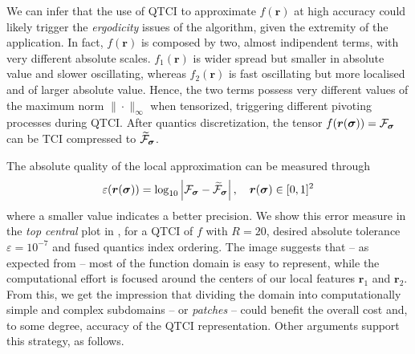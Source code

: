 We can infer that the use of QTCI to approximate $f(\boldsymbol{r})$ at high accuracy could likely trigger the \textit{ergodicity} issues of the algorithm, given the extremity of the application. In fact, $f(\boldsymbol{r})$ is composed by two, almost indipendent terms, with very different absolute scales. $f_1(\boldsymbol{r})$ is wider spread but smaller in absolute value and slower oscillating, whereas $f_2(\boldsymbol{r})$ is fast oscillating but more localised and of larger absolute value. Hence, the two terms possess very different values of the maximum norm $\| \cdot \|_\infty$ when tensorized, triggering different pivoting processes during QTCI. After quantics discretization, the tensor $f(\boldsymbol{r}(\boldsymbol{\sigma})) = \mathcal{F}_{\boldsymbol{\sigma}}$ can be TCI compressed to $\widetilde{\mathcal{F}}_{\boldsymbol{\sigma}}$. 

The absolute quality of the local approximation can be measured through 
\begin{equation}
	\varepsilon(\boldsymbol{r}(\boldsymbol{\sigma})) = \log_{10}\left|\mathcal{F}_{\boldsymbol{\sigma}} - \widetilde{\mathcal{F}}_{\boldsymbol{\sigma}}\right|, \quad \boldsymbol{r}(\boldsymbol{\sigma}) \in [0,1]^2
	\label{eq:logTCIerror}
\end{equation}
where a smaller value indicates a better precision. 
We show this error measure in the \textit{top central} plot in , for a QTCI of $f$ with $R=20$, desired absolute tolerance $\varepsilon = 10^{-7}$ and fused quantics index ordering. The image suggests that -- as expected from  -- most of the function domain is easy to represent, while the computational effort is focused around the centers of our local features $\boldsymbol{r}_1$ and $\boldsymbol{r}_2$. From this, we get the impression that dividing the domain into computationally simple and complex subdomains -- or \textit{patches} -- could benefit the overall cost and, to some degree, accuracy of the QTCI representation. Other arguments support this strategy, as follows. 

